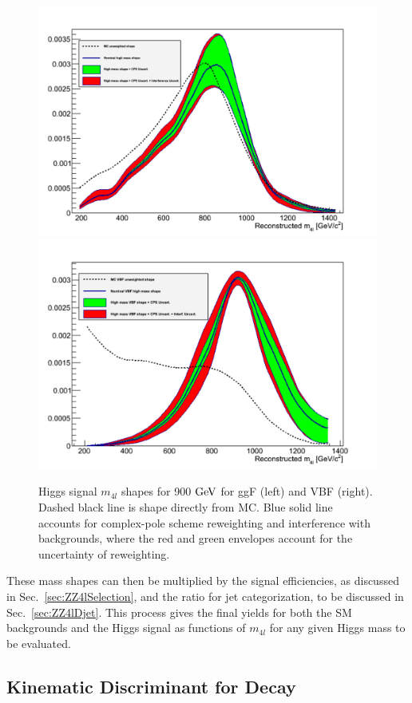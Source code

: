 \begin{figure}[htbp]
\begin{center}
\includegraphics[width=.45\linewidth]{HiggsDiscovery/figures/H900_4mu_Reco_syst.pdf}
\includegraphics[width=.45\linewidth]{HiggsDiscovery/figures/VBFH900_4mu_Reco_syst.pdf}
\caption[High Mass Higgs Signal Mass Shapes]{Higgs signal $m_{4l}$ shapes for 900 $\rm{GeV}$ for ggF (left) and VBF (right). Dashed black line is shape directly from MC. Blue solid line accounts for complex-pole scheme reweighting and interference with backgrounds, where the red and green envelopes account for the uncertainty of reweighting.}
\label{fig:HMHiggsShape}
\end{center}
\end{figure}

These mass shapes can then be multiplied by the signal efficiencies, as discussed in Sec.~\ref{sec:ZZ4lSelection}, and the ratio for jet categorization, to be discussed in Sec.~\ref{sec:ZZ4lDjet}. This process gives the final yields for both the SM backgrounds and the Higgs signal as functions of $m_{4l}$ for any given Higgs mass to be evaluated.

\subsection{Kinematic Discriminant for Decay}
\label{sec:ZZ4lKD}

